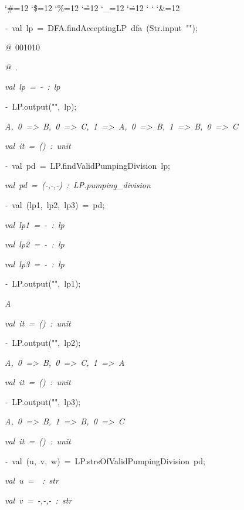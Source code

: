 \begin{list}{}
{\setlength{\leftmargin}{\leftmargini}
\setlength{\rightmargin}{0cm}
\setlength{\itemindent}{0cm}
\setlength{\listparindent}{0cm}
\setlength{\itemsep}{0cm}
\setlength{\parsep}{0cm}
\setlength{\labelsep}{0cm}
\setlength{\labelwidth}{0cm}
\catcode`\#=12
\catcode`\$=12
\catcode`\%=12
\catcode`\^=12
\catcode`\_=12
\catcode`\.=12
\catcode`
\catcode`
\catcode`\&=12
\ttfamily}
\small
\item[]\textsl{-\ }val\ lp\ =\ DFA.findAcceptingLP\ dfa\ (Str.input\ "");
\item[]\textsl{@\ }001010
\item[]\textsl{@\ }.
\item[]\textsl{val\ lp\ =\ -\ :\ lp}
\item[]\textsl{-\ }LP.output("",\ lp);
\item[]\textsl{A,\ 0\ =>\ B,\ 0\ =>\ C,\ 1\ =>\ A,\ 0\ =>\ B,\ 1\ =>\ B,\ 0\ =>\ C}
\item[]\textsl{val\ it\ =\ ()\ :\ unit}
\item[]\textsl{-\ }val\ pd\ =\ LP.findValidPumpingDivision\ lp;\ 
\item[]\textsl{val\ pd\ =\ (-,-,-)\ :\ LP.pumping_division}
\item[]\textsl{-\ }val\ (lp1,\ lp2,\ lp3)\ =\ pd;
\item[]\textsl{val\ lp1\ =\ -\ :\ lp}
\item[]\textsl{val\ lp2\ =\ -\ :\ lp}
\item[]\textsl{val\ lp3\ =\ -\ :\ lp}
\item[]\textsl{-\ }LP.output("",\ lp1);
\item[]\textsl{A}
\item[]\textsl{val\ it\ =\ ()\ :\ unit}
\item[]\textsl{-\ }LP.output("",\ lp2);
\item[]\textsl{A,\ 0\ =>\ B,\ 0\ =>\ C,\ 1\ =>\ A}
\item[]\textsl{val\ it\ =\ ()\ :\ unit}
\item[]\textsl{-\ }LP.output("",\ lp3);
\item[]\textsl{A,\ 0\ =>\ B,\ 1\ =>\ B,\ 0\ =>\ C}
\item[]\textsl{val\ it\ =\ ()\ :\ unit}
\item[]\textsl{-\ }val\ (u,\ v,\ w)\ =\ LP.strsOfValidPumpingDivision\ pd;
\item[]\textsl{val\ u\ =\ \ :\ str}
\item[]\textsl{val\ v\ =\ \symbol{'133}-,-,-\symbol{'135}\ :\ str}

\end{list}

